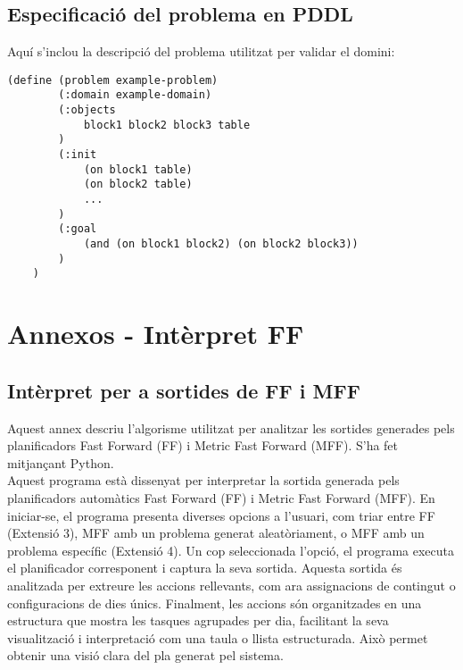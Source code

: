 \documentclass[a4paper]{article}
\begin{document}
	\subsection{Especificació del problema en PDDL}
	Aquí s'inclou la descripció del problema utilitzat per validar el domini:
	
	\begin{lstlisting}[language=PDDL, caption={Especificació del problema en PDDL}, label={lst:problemaPDDL}]
	(define (problem example-problem)
		(:domain example-domain)
		(:objects
			block1 block2 block3 table
		)
		(:init
			(on block1 table)
			(on block2 table)
			...
		)
		(:goal
			(and (on block1 block2) (on block2 block3))
		)
	)
	\end{lstlisting}
	
	\newpage
	\section{Annexos - Intèrpret FF}
	
	\subsection{Intèrpret per a sortides de FF i MFF}
	\label{sec:FFInterpreter.py}
	
	Aquest annex descriu l'algorisme utilitzat per analitzar les sortides generades pels planificadors Fast Forward (FF) i Metric Fast Forward (MFF). S'ha fet mitjançant Python. \\
	
	Aquest programa està dissenyat per interpretar la sortida generada pels planificadors automàtics Fast Forward (FF) i Metric Fast Forward (MFF). En iniciar-se, el programa presenta diverses opcions a l'usuari, com triar entre FF (Extensió 3), MFF amb un problema generat aleatòriament, o MFF amb un problema específic (Extensió 4). Un cop seleccionada l'opció, el programa executa el planificador corresponent i captura la seva sortida. Aquesta sortida és analitzada per extreure les accions rellevants, com ara assignacions de contingut o configuracions de dies únics. Finalment, les accions són organitzades en una estructura que mostra les tasques agrupades per dia, facilitant la seva visualització i interpretació com una taula o llista estructurada. Això permet obtenir una visió clara del pla generat pel sistema.
	
\end{document}
